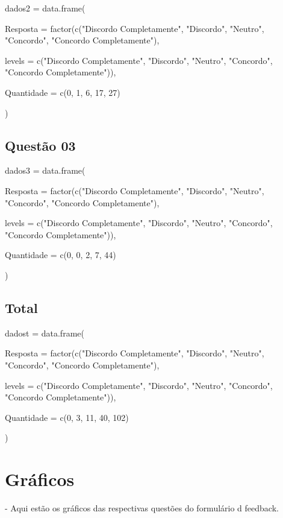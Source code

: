 \documentclass{article}
\begin{document}
dados2 = data.frame(

  Resposta = factor(c("Discordo Completamente", "Discordo", "Neutro", "Concordo", "Concordo Completamente"),
  
                    levels = c("Discordo Completamente", "Discordo", "Neutro", "Concordo", 
                               "Concordo Completamente")),
                               
  Quantidade = c(0, 1, 6, 17, 27)
  
)


\subsection{Questão 03}

dados3 = data.frame(

  Resposta = factor(c("Discordo Completamente", "Discordo", "Neutro", "Concordo", "Concordo Completamente"),
  
                    levels = c("Discordo Completamente", "Discordo", "Neutro", "Concordo", 
                               "Concordo Completamente")),
                               
  Quantidade = c(0, 0, 2, 7, 44)
  
)


\subsection{Total}

dadost = data.frame(

  Resposta = factor(c("Discordo Completamente", "Discordo", "Neutro", "Concordo", "Concordo Completamente"),
  
                    levels = c("Discordo Completamente", "Discordo", "Neutro", "Concordo", 
                               "Concordo Completamente")),
                               
  Quantidade = c(0, 3, 11, 40, 102)
  
)




\section{Gráficos}

- Aqui estão os gráficos das respectivas questões do formulário d feedback.

\vspace{1.5cm}
\end{document}
